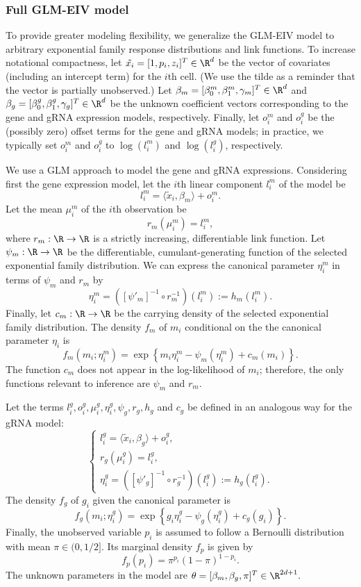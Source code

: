 \documentclass[12pt]{article}
\begin{document}
\subsubsection*{Full GLM-EIV model}
To provide greater modeling flexibility, we generalize the GLM-EIV model to arbitrary exponential family response distributions and link functions. To increase notational compactness, let $\tilde{x_i} = [1, p_i, z_i]^T \in \R^d$ be the vector of covariates (including an intercept term) for the $i$th cell. (We use the tilde as a reminder that the vector is partially unobserved.) Let $\beta_m = [\beta^m_0, \beta^m_1, \gamma_m]^T \in \R^d$ and $\beta_g = [\beta^g_0, \beta^g_1, \gamma_g]^T \in \R^d$ be the unknown coefficient vectors corresponding to the gene and gRNA expression models, respectively. Finally, let $o^m_i$ and $o^g_i$ be the (possibly zero) offset terms for the gene and gRNA models; in practice, we typically set $o^m_i$ and $o^g_i$ to $\log(l^m_i)$ and $\log(l^g_i)$, respectively.

We use a GLM approach to model the gene and gRNA expressions. Considering first the gene expression model, let the $i$th linear component $l^m_i$ of the model be $$l^m_i = \langle \tilde{x}_i, \beta_m \rangle + o^m_i.$$ Let the mean $\mu^m_i$ of the $i$th observation be
$$r_m(\mu^m_i) = l^m_i,$$ where $r_m:\R \to \R$ is a strictly increasing, differentiable link function. Let $\psi_m: \R \to \R$ be the differentiable, cumulant-generating function of the selected exponential family distribution. We can express the canonical parameter $\eta^m_i$ in terms of $\psi_m$ and $r_m$ by
$$\eta^m_i = \left([\psi'_m]^{-1} \circ r^{-1}_m\right)(l_i^m) := h_m(l_i^m).$$ Finally, let $c_m: \R \to \R$ be the carrying density of the selected exponential family distribution. The density $f_m$ of $m_i$ conditional on the the canonical parameter $\eta_i$ is
$$f_m(m_i; \eta^m_i) = \exp\left\{ m_i \eta^m_i - \psi_m(\eta^m_i) + c_m(m_i) \right\}.$$ The function $c_m$ does not appear in the log-likelihood of $m_i$; therefore, the only functions relevant to inference are $\psi_m$ and $r_m$.

Let the terms $l^g_i, o^g_i, \mu^g_i, \eta^g_i, \psi_g, r_g, h_g$ and $c_g$ be defined in an analogous way for the gRNA model:
$$
\begin{cases}
l^g_i = \langle \tilde{x}_i, \beta_g \rangle + o^g_i,\\
r_g(\mu^g_i) = l^g_i,\\
\eta^g_i = \left([\psi'_g]^{-1} \circ r^{-1}_g\right)(l_i^g) := h_g(l_i^g).
\end{cases}
$$
The density $f_g$ of $g_i$ given the canonical parameter is
$$f_g(m_i; \eta^g_i) = \exp\left\{g_i \eta^g_i - \psi_g(\eta^g_i) + c_g(g_i)\right\}.$$
Finally, the unobserved variable $p_i$ is assumed to follow a Bernoulli distribution with mean $\pi \in (0, 1/2]$. Its marginal density $f_p$ is given by
$$f_p(p_i) = \pi^{p_i}(1-\pi)^{1 - p_i}.$$
The unknown parameters in the model are
$\theta = [\beta_m, \beta_g, \pi]^{T}  \in \R^{2d + 1}.$
\end{document}
